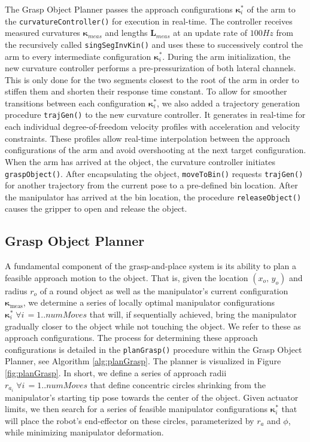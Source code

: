 The Grasp Object Planner passes the approach configurations $\boldsymbol{\kappa}_i^*$ of the arm to the \texttt{curvatureController()} for execution in real-time.
The controller receives measured curvatures $\boldsymbol{\kappa}_{meas}$ and lengths $\boldsymbol{L}_{meas}$ at an update rate of $100\unit{Hz}$ from the recursively called \texttt{singSegInvKin()} and uses these to successively control the arm to every intermediate configuration $\boldsymbol{\kappa}_i^*$.
During the arm initialization, the new curvature controller performs a pre-pressurization of both lateral channels. 
This is only done for the two segments closest to the root of the arm in order to stiffen them and shorten their response time constant.  
To allow for smoother transitions between each configuration $\boldsymbol{\kappa}_i^*$, we also added a trajectory generation procedure \texttt{trajGen()} to the new curvature controller. It generates in real-time for each individual degree-of-freedom velocity profiles with acceleration and velocity constraints.
These profiles allow real-time interpolation between the approach configurations of the arm and avoid overshooting at the next target configuration.
When the arm has arrived at the object, the curvature controller initiates \texttt{graspObject()}.
After encapsulating the object, \texttt{moveToBin()} requests \texttt{trajGen()} for another trajectory from the current pose to a pre-defined bin location.
After the manipulator has arrived at the bin location, the procedure \texttt{releaseObject()} causes the gripper to open and release the object.

\subsection{Grasp Object Planner}
\label{subsec:grasp_planner}
A fundamental component of the grasp-and-place system is its ability to plan a feasible approach motion to the object.
That is, given the location $\left(x_o, \, y_o\right)$ and radius $r_o$ of a round object as well as the manipulator's current configuration $\boldsymbol{\kappa}_{\textrm{meas}}$, we determine a series of locally optimal manipulator configurations $\boldsymbol{\kappa}_i^* \; \forall i \, = 1.. numMoves$ that will, if sequentially achieved, bring the manipulator gradually closer to the object while  not touching the object.
We refer to these as approach configurations.
The process for determining these approach configurations is detailed in the \texttt{planGrasp()} procedure within the Grasp Object Planner, see Algorithm \ref{alg:planGrasp}.
The planner is visualized in Figure \ref{fig:planGrasp}.
In short, we define a series of approach radii $r_{a_i} \;  \forall i\, = 1.. numMoves$ that define concentric circles shrinking from the manipulator's starting tip pose towards the center of the object.
Given actuator limits, we then search for a series of feasible manipulator configurations $\boldsymbol{\kappa}_i^*$ that will place the robot's end-effector on these circles, parameterized by $r_a$ and $\phi$, while minimizing manipulator deformation.

